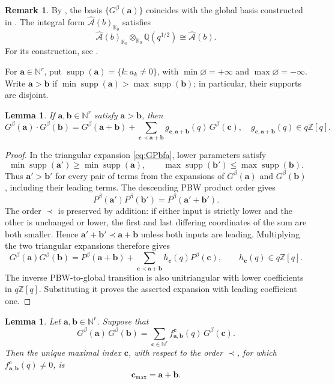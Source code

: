 \documentclass[12pt, reqno]{amsart}
\theoremstyle{plain}
\newtheorem{lemma}[theorem]{Lemma}
\theoremstyle{definition}
\newtheorem{remark}[theorem]{Remark}
\numberwithin{equation}{section}
\newcommand{\bb}{\mathbf{b}}
\newcommand{\bfa}{\mathbf{a}}
\begin{document}
\begin{remark}
By \cite[Lemma~4.17]{kashiwara2024braid}, the basis
\(\{G^\beta(\mathbf a)\}\) coincides with the global basis constructed in
\cite{kashiwara2025global}. The integral form
\(\widehat{\mathcal A}(b)_{\mathbb K_0}\) satisfies
\[
\widehat{\mathcal A}(b)_{\mathbb K_0}
\otimes_{\mathbb K_0}\mathbb Q(q^{1/2})
\cong
\widehat{\mathcal A}(b).
\]
For its construction, see \cite{kashiwara2025global}.
\end{remark}
For $\mathbf a\in\mathbb N^r$, put
$\operatorname{supp}(\mathbf a)=\{k:a_k\ne0\}$, with
$\min\varnothing=+\infty$ and $\max\varnothing=-\infty$.
Write $\mathbf a>\mathbf b$ if
$\min\operatorname{supp}(\mathbf a)>\max\operatorname{supp}(\mathbf b)$;
in particular, their supports are disjoint.

\begin{lemma}\label{lem:Gproductab}
If \(\bfa,\bb\in\mathbb N^r\) satisfy \(\bfa>\bb\), then
\[
G^\beta(\bfa)\cdot G^\beta(\bb)
=
G^\beta(\bfa+\bb)
+
\sum_{\mathbf{c}\prec\bfa+\bb}
g_{\mathbf{c},\bfa+\bb}(q)\,G^\beta(\mathbf{c}),
\quad
g_{\mathbf{c},\bfa+\bb}(q)\in q\mathbb Z[q].
\]
\end{lemma}

\begin{proof}
In the triangular expansion \eqref{eq:GPbfa}, lower parameters satisfy
\[
    \min\operatorname{supp}(\mathbf a')\geq
       \min\operatorname{supp}(\mathbf a),\qquad
    \max\operatorname{supp}(\mathbf b')\leq
       \max\operatorname{supp}(\mathbf b).
\]
Thus $\mathbf a'>\mathbf b'$ for every pair of terms from the expansions
of $G^\beta(\mathbf a)$ and $G^\beta(\mathbf b)$, including their leading
terms. The descending PBW product order gives
\[
    P^\beta(\mathbf a')P^\beta(\mathbf b')
    =P^\beta(\mathbf a'+\mathbf b').
\]
The order $\prec$ is preserved by addition: if either input is strictly
lower and the other is unchanged or lower, the first and last differing
coordinates of the sum are both smaller. Hence
$\mathbf a'+\mathbf b'\prec\mathbf a+\mathbf b$ unless both inputs
are leading. Multiplying the two triangular expansions therefore gives
\[
    G^\beta(\mathbf a)G^\beta(\mathbf b)
    =P^\beta(\mathbf a+\mathbf b)
      +\sum_{\mathbf c\prec\mathbf a+\mathbf b}
         h_{\mathbf c}(q)P^\beta(\mathbf c),
    \qquad h_{\mathbf c}(q)\in q\mathbb Z[q].
\]
The inverse PBW-to-global transition is also unitriangular with lower
coefficients in $q\mathbb Z[q]$. Substituting it proves the asserted
expansion with leading coefficient one.
\end{proof}
\begin{lemma}\label{lem:twoprod}
Let \(\bfa,\bb\in\mathbb N^r\). Suppose that
\[
G^\beta(\bfa)\,G^\beta(\bb)
=
\sum_{\mathbf c\in\mathbb N^r}
f_{\bfa,\bb}^{\mathbf c}(q)\,G^\beta(\mathbf c).
\]
Then the unique maximal index \(\mathbf c\), with respect to the order \(\prec\), for which
\(f_{\bfa,\bb}^{\mathbf c}(q)\neq 0\), is
\[
\mathbf c_{\max}=\bfa+\bb.
\]
\end{lemma}
\end{document}
